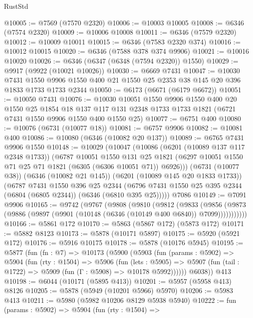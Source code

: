 \begin{lexlean}{RustStd}
\begin{coremodule}
@10005 := @7569 (@7570 @2320)
@10006 := @10003 @10005
@10008 := @6346 (@7574 @2320)
@10009 := @10006 @10008
@10011 := @6346 (@7579 @2320)
@10012 := @10009 @10011
@10015 := @6346 (@7583 @2320 @374)
@10016 := @10012 @10015
@10020 := @6346 (@7588 @378 @374 @9906)
@10021 := @10016 @10020
@10026 := @6346 (@6347 (@6348 (@7594 @2320)) @1550)
@10029 := @9917 (@9922 (@10021 @10026))
@10030 := @6669 @7431
@10047 := @10030
    @7431
    @1550
    @9906
    @1550
    @400
    @21
    @1550
    @25
    @2353
    @38
    @145
    @20
    @396
    @1833
    @1733
    @1733
    @2344
@10050 := @6173 (@6671 (@6179 @6672))
@10051 := @10050 @7431
@10076 := @10030
    @10051
    @1550
    @9906
    @1550
    @400
    @20
    @1550
    @25
    @1854
    @18
    @137
    @117
    @131
    @2348
    @1733
    @1733
    @1821
    (@6721 @7431 @1550 @9906 @1550 @400 @1550 @25)
@10077 := @6751 @400
@10080 := @10076 (@6731 (@10077 @18))
@10081 := @6757 @9906
@10082 := @10081 @400
@10086 := @10080 (@6346 (@10082 @20 @137))
@10089 := @6765 @7431 @9906 @1550
@10148 := @10029
    (@10047
      (@10086
        (@6201 (@10089 @137 @117 @2348 @1733))
        (@6787
          @10051
          @1550
          @131
          @25
          @1821
          (@6297 @10051 @1550 @71 @25 @71 @1821 (@6305 (@6306 @10051 @71)) @6926)))
      (@6731 (@10077 @38))
      (@6346 (@10082 @21 @145))
      (@6201 (@10089 @145 @20 @1833 @1733))
      (@6787
        @7431
        @1550
        @396
        @25
        @2344
        (@6796 @7431 @1550 @25 @395 @2344 (@6804 (@6805 @2344)) (@6346 (@6810 @395 @25)))))
    @7086
@10149 := @7091 @9906
@10165 := @9742
    (@9767
      (@9808
        (@9810
          (@9812
            (@9833
              (@9856
                (@9873 (@9886 (@9897 (@9901 (@10148 (@6346 (@10149 @400 @6840)) @7099)))))))))))
@10166 := @5861 @172
@10170 := @5863 (@5867 @172) (@5873 @172)
@10171 := @5882 @8123
@10173 := @5878 (@10171 @5897)
@10175 := @5920 (@5921 @172)
@10176 := @5916 @10175
@10178 := @5878 (@10176 @5945)
@10195 := @5877
    (fun (fn : @7) =>
    @10173
      (@5900
        (@5903
          (fun (params : @5902) =>
          @5904
            (fun (rty : @1504) =>
            @5906
              (fun (lets : @5905) =>
              @5907 (fun (tail : @1722) => @5909 (fun (Γ : @5908) => @10178 @5992))))))
        @6038))
    @413
@10198 := @6044 (@10171 (@5895 @413))
@10201 := @5957 (@5958 @413) @8126
@10205 := @5878 (@5949 (@10201 @5966) @5970)
@10206 := @5983 @413
@10211 := @5980 (@5982 @10206 @8129 @5938 @5940)
@10222 := fun (params : @5902) =>
  @5904
    (fun (rty : @1504) =>

\end{coremodule}
\end{lexlean}
